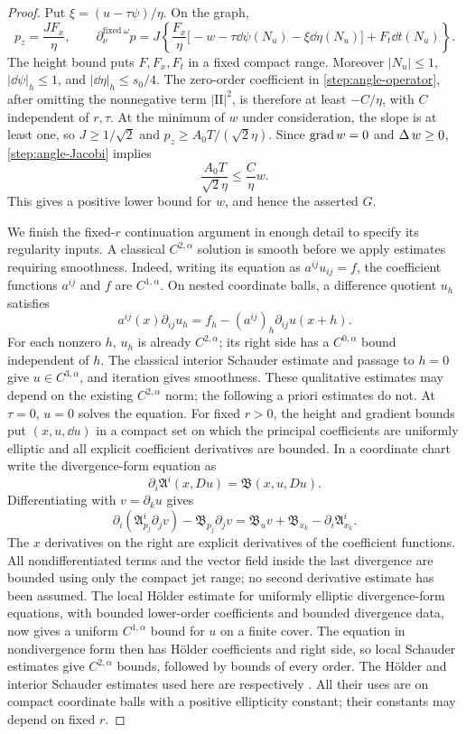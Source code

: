 \begin{proof}
Put $\xi=(u-\tau\psi)/\eta$.  On the graph,
\[
 p_z=\frac{JF_x}{\eta},\qquad
 \partial_\nu^{\mathrm{fixed}\ \omega}p
 =J\left\{
 \frac{F_x}{\eta}\bigl[-w-\tau\dd\psi(N_u)-\xi\dd\eta(N_u)\bigr]
 +F_t\dd t(N_u)\right\}.
\]
The height bound puts $F,F_x,F_t$ in a fixed compact range.  Moreover
$|N_u|\le1$, $|\dd\psi|_h\le1$, and $|\dd\eta|_h\le s_0/4$.
The zero-order coefficient in \cref{step:angle-operator}, after omitting
the nonnegative term $|\mathrm{II}|^2$, is therefore at least $-C/\eta$,
with $C$ independent of $r,\tau$.  At the minimum of $w$ under
consideration, the slope is at least one, so $J\ge1/\sqrt2$ and
$p_z\ge A_0T/(\sqrt2\eta)$.  Since $\operatorname{grad} w=0$ and $\operatorname{\Delta} w\ge0$,
\cref{step:angle-Jacobi} implies
\[
 \frac{A_0T}{\sqrt2\eta}\le\frac C\eta w.
\]
This gives a positive lower bound for $w$, and hence the asserted $G$.

We finish the fixed-$r$ continuation argument in enough detail to specify
its regularity inputs. A classical $C^{2,\alpha}$ solution is smooth before
we apply estimates requiring smoothness. Indeed, writing its equation as
$a^{ij}u_{ij}=f$, the coefficient functions $a^{ij}$ and $f$ are
$C^{1,\alpha}$. On nested coordinate balls, a difference quotient $u_h$
satisfies
\[
 a^{ij}(x)\partial_{ij}u_h
 =f_h-(a^{ij})_h\partial_{ij}u(x+h).
\]
For each nonzero $h$, $u_h$ is already $C^{2,\alpha}$; its right side has
a $C^{0,\alpha}$ bound independent of $h$. The classical interior Schauder
estimate and passage to $h=0$ give $u\in C^{3,\alpha}$, and iteration gives
smoothness. These qualitative estimates may depend on the existing
$C^{2,\alpha}$ norm; the following a priori estimates do not.  At $\tau=0$, $u=0$ solves the equation.  For fixed
$r>0$, the height and gradient bounds put $(x,u,\dd u)$ in a compact set
on which the principal coefficients are uniformly elliptic and all
explicit coefficient derivatives are bounded.  In a coordinate chart
write the divergence-form equation as
\[
 \partial_i\mathfrak A^i(x,Du)=\mathfrak B(x,u,Du).
\]
Differentiating with $v=\partial_ku$ gives
\begin{equation}\label{step:differentiated}
 \partial_i(\mathfrak A^i_{p_j}\partial_jv)
 -\mathfrak B_{p_j}\partial_jv
 =\mathfrak B_u v+\mathfrak B_{x_k}
   -\partial_i\mathfrak A^i_{x_k}.
\end{equation}
The $x$ derivatives on the right are explicit derivatives of the
coefficient functions.  All nondifferentiated terms and the vector field
inside the last divergence are bounded using only the compact jet range;
no second derivative estimate has been assumed.  The local Hölder
estimate for uniformly elliptic divergence-form equations, with bounded
lower-order coefficients and bounded divergence data, now gives a
uniform $C^{1,\alpha}$ bound for $u$ on a finite cover.  The equation in
nondivergence form then has Hölder coefficients and right side, so local
Schauder estimates give $C^{2,\alpha}$ bounds, followed by bounds of
every order.  The H\"older and interior Schauder estimates used here
are respectively \citet[Lecture~18, Theorem~3, and Lecture~12,
Theorem~2]{simonPDE}.
All their uses are on compact coordinate balls with a positive
ellipticity constant; their constants may depend on fixed $r$.


\end{proof}
